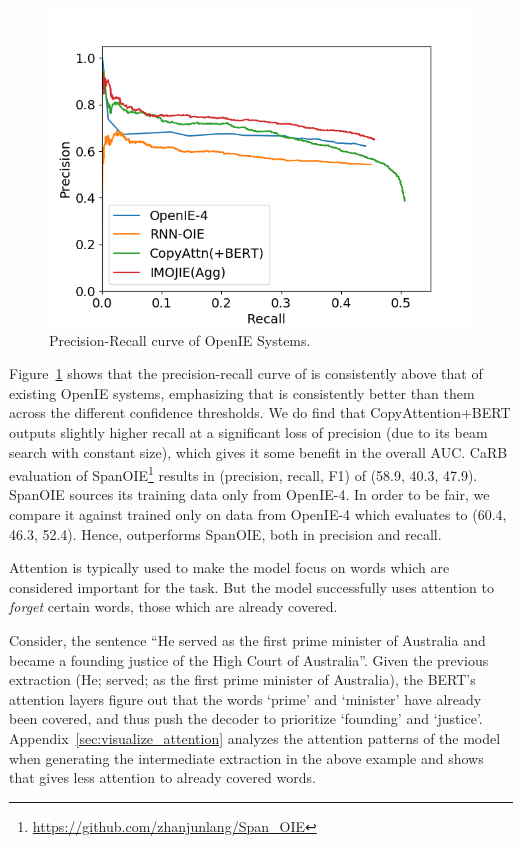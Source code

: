         \begin{figure}[t]
            \centering
        \vspace*{-3ex}
        \includegraphics[scale=0.80]{images/imojie/imojie.png}
        \caption{Precision-Recall curve of OpenIE Systems.}
        \label{fig:pr-curve}
        \end{figure}

        Figure~\ref{fig:pr-curve} shows that the precision-recall curve of \shortname{} is consistently above that of existing OpenIE systems, emphasizing that \shortname{} is consistently better than them across the different confidence thresholds. We do find that CopyAttention+BERT outputs slightly higher recall at a significant loss of precision (due to its beam search with constant size), which gives it some benefit in the overall AUC. CaRB evaluation of SpanOIE\footnote{\href{https://github.com/zhanjunlang/Span\_OIE}{https://github.com/zhanjunlang/Span\_OIE}} results in (precision, recall, F1) of (58.9, 40.3, 47.9). SpanOIE sources its training data only from OpenIE-4. In order to be fair, we compare it against \shortname{} trained only on data from OpenIE-4 which evaluates to (60.4, 46.3, 52.4). Hence, \shortname{} outperforms SpanOIE, both in precision and recall.

        Attention is typically used to make the model focus on words which are considered important for the task. But the \shortname{} model successfully uses attention to \emph{forget} certain words, those which are already covered. 
        
        Consider, the sentence ``He served as the first prime minister of Australia and became a founding justice of the High Court of Australia''. 
        Given the previous extraction (He; served; as the first prime minister of Australia), the BERT’s attention layers figure out that the words `prime' and `minister' have already been covered, and thus push the decoder to prioritize `founding' and `justice'.
        Appendix~\ref{sec:visualize_attention} analyzes the attention patterns of the model when generating the intermediate extraction in the above example and shows that \shortname{} gives less attention to already covered words.


